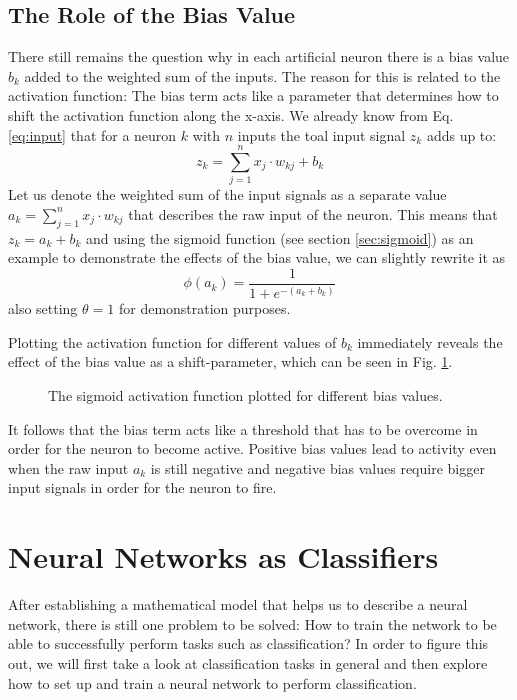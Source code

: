 \subsection{The Role of the Bias Value}
\label{sec:bias}
There still remains the question why in each artificial neuron there
is a bias value \(b_k\) added to the weighted sum of the inputs. The
reason for this is related to the activation function: The bias term
acts like a parameter that determines how to shift the activation
function along the x-axis. We already know from Eq. \ref{eq:input} that
for a neuron \(k\) with \(n\) inputs the toal input signal \(z_k\)
adds up to:
\begin{equation*}
  z_k = \sum_{j=1}^{n}{x_j \cdot w_{kj}} + b_k
\end{equation*}
Let us denote the weighted sum of the input signals as a separate
value \(a_k = \sum_{j=1}^{n}{x_j \cdot w_{kj}}\) that describes the raw
input of the neuron. This means that \(z_k
= a_k + b_k\) and using the sigmoid function (see section
\ref{sec:sigmoid}) as an example to
demonstrate the effects of the bias value, we can slightly rewrite it as
\begin{equation*}
  \phi(a_k) = \frac{1}{1+e^{-(a_k+b_k)}}
\end{equation*}
also setting \(\theta = 1\) for demonstration purposes.

Plotting the activation function for
different values of \(b_k\) immediately reveals the effect of the bias
value as a shift-parameter, which can be seen in Fig. \ref{fig:bias}.
\begin{figure}[h]
  \centering
  
  \caption{The sigmoid activation function plotted for different bias values.}
  \label{fig:bias}
\end{figure}

It follows that the bias term acts like a threshold that
has to be overcome in order for the neuron to become active. Positive
bias values lead to activity even when the raw input \(a_k\) is still
negative and negative bias values require bigger input signals in
order for the neuron to fire.

\section{Neural Networks as Classifiers}

After establishing a mathematical model that helps us to describe a
neural network, there is still one problem to be solved: How to train
the network to be able to successfully perform tasks such as
classification? In order to figure this out, we will first take a look at
classification tasks in general and then explore how to set up and
train a neural network to perform classification.

